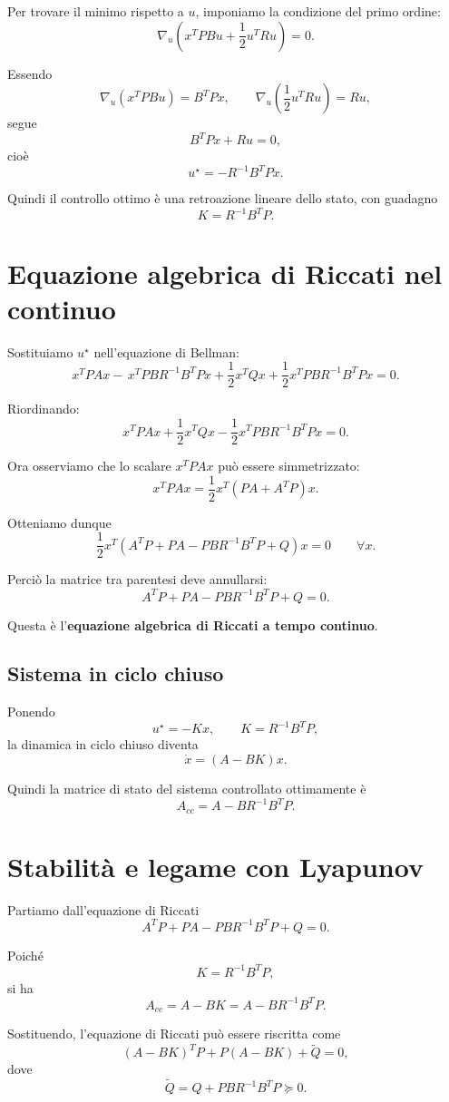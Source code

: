 Per trovare il minimo rispetto a \(u\), imponiamo la condizione del primo ordine:
\[
\nabla_u\!\left(
x^TPBu+\frac12 u^TRu
\right)=0.
\]

Essendo
\[
\nabla_u(x^TPBu)=B^TPx,
\qquad
\nabla_u\!\left(\frac12 u^TRu\right)=Ru,
\]
segue
\[
B^TPx+Ru=0,
\]
cioè
\[
\boxed{
u^\star=-R^{-1}B^TPx.
}
\]

Quindi il controllo ottimo è una retroazione lineare dello stato, con guadagno
\[
K=R^{-1}B^TP.
\]

\section{Equazione algebrica di Riccati nel continuo}

Sostituiamo \(u^\star\) nell'equazione di Bellman:
\[
x^TPAx
-\,
x^TPBR^{-1}B^TPx
+
\frac12 x^TQx
+
\frac12 x^TPBR^{-1}B^TPx
=0.
\]

Riordinando:
\[
x^TPAx
+\frac12 x^TQx
-\frac12 x^TPBR^{-1}B^TPx
=0.
\]

Ora osserviamo che lo scalare \(x^TPAx\) può essere simmetrizzato:
\[
x^TPAx
=
\frac12 x^T(PA+A^TP)x.
\]

Otteniamo dunque
\[
\frac12 x^T
\left(
A^TP+PA-PBR^{-1}B^TP+Q
\right)x=0
\qquad \forall x.
\]

Perciò la matrice tra parentesi deve annullarsi:
\[
\boxed{
A^TP+PA-PBR^{-1}B^TP+Q=0.
}
\]

Questa è l'\textbf{equazione algebrica di Riccati a tempo continuo}.

\subsection{Sistema in ciclo chiuso}

Ponendo
\[
u^\star=-Kx,
\qquad
K=R^{-1}B^TP,
\]
la dinamica in ciclo chiuso diventa
\[
\dot x=(A-BK)x.
\]

Quindi la matrice di stato del sistema controllato ottimamente è
\[
A_{cc}=A-BR^{-1}B^TP.
\]

\section{Stabilità e legame con Lyapunov}

Partiamo dall'equazione di Riccati
\[
A^TP+PA-PBR^{-1}B^TP+Q=0.
\]

Poiché
\[
K=R^{-1}B^TP,
\]
si ha
\[
A_{cc}=A-BK=A-BR^{-1}B^TP.
\]

Sostituendo, l'equazione di Riccati può essere riscritta come
\[
(A-BK)^TP + P(A-BK) + \widetilde Q = 0,
\]
dove
\[
\widetilde Q = Q + PBR^{-1}B^TP \succeq 0.
\]

